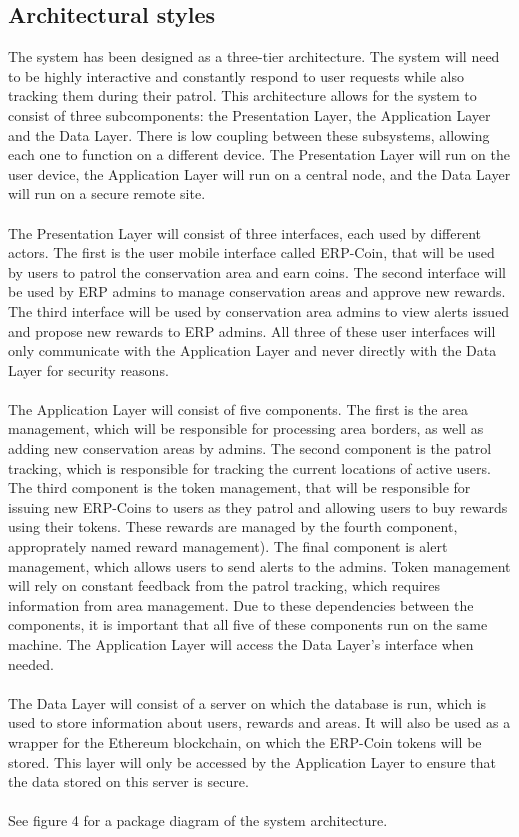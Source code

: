 \documentclass{article}
\begin{document}
\subsection{Architectural styles}
The system has been designed as a three-tier architecture. The system will need to be highly interactive and constantly respond to user requests while also tracking them during their patrol. This architecture allows for the system to consist of three subcomponents: the Presentation Layer, the Application Layer and the Data Layer. There is low coupling between these subsystems, allowing each one to function on a different device. The Presentation Layer will run on the user device, the Application Layer will run on a central node, and the Data Layer will run on a secure remote site.\\\\The Presentation Layer will consist of three interfaces, each used by different actors. The first is the user mobile interface called ERP-Coin, that will be used by users to patrol the conservation area and earn coins. The second interface will be used by ERP admins to manage conservation areas and approve new rewards. The third interface will be used by conservation area admins to view alerts issued and propose new rewards to ERP admins. All three of these user interfaces will only communicate with the Application Layer and never directly with the Data Layer for security reasons.\\\\The Application Layer will consist of five components. The first is the area management, which will be responsible for processing area borders, as well as adding new conservation areas by admins. The second component is the patrol tracking, which is responsible for tracking the current locations of active users. The third component is the token management, that will be responsible for issuing new ERP-Coins to users as they patrol and allowing users to buy rewards using their tokens. These rewards are managed by the fourth component, approprately named reward management). The final component is alert management, which allows users to send alerts to the admins. Token management will rely on constant feedback from the patrol tracking, which requires information from area management. Due to these dependencies between the components, it is important that all five of these components run on the same machine. The Application Layer will access the Data Layer's interface when needed.\\\\The Data Layer will consist of a server on which the database is run, which is used to store information about users, rewards and areas. It will also be used as a wrapper for the Ethereum blockchain, on which the ERP-Coin tokens will be stored. This layer will only be accessed by the Application Layer to ensure that the data stored on this server is secure.\\\\See figure 4 for a package diagram of the system architecture.
\end{document}

